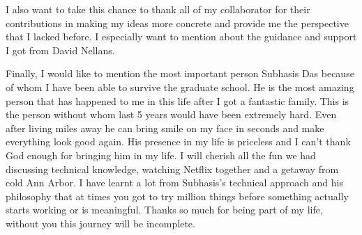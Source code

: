 I also want to take this chance to thank all of my collaborator for their
contributions in making my ideas more concrete and provide me the perspective
that I lacked before. I especially want to mention about the guidance and
support I got from David Nellans. 

Finally, I would like to mention the most important person Subhasis Das because
of whom I have been able to survive the graduate school. He is the most amazing
person that has happened to me in this life after I got a fantastic family. This
is the person without whom last 5 years would have been extremely hard. Even
after living miles away he can bring smile on my face in seconds and make
everything look good again. His presence in my life is priceless and I can't
thank God enough for bringing him in my life.  I will cherish all the fun we had
discussing technical knowledge, watching Netflix together and a getaway from
cold Ann Arbor. I have learnt a lot from Subhasis's technical approach and his
philosophy that at times you got to try million things before something actually
starts working or is meaningful. Thanks so much for being part of my life,
without you this journey will be incomplete.
